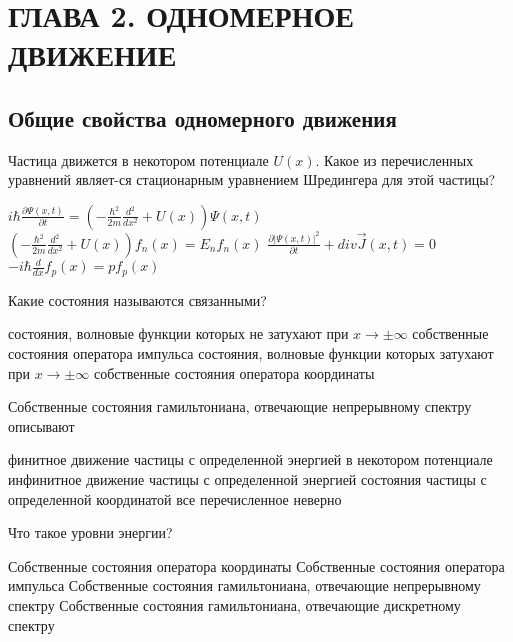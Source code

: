 \documentclass[11pt,a4paper]{exam}
\begin{document}
\section{ ГЛАВА 2. ОДНОМЕРНОЕ ДВИЖЕНИЕ }



\subsection{ Общие свойства одномерного движения }
\begin{questions}

\question Частица движется в некотором потенциале $U(x)$. Какое из перечисленных уравнений являет-ся стационарным уравнением Шредингера для этой частицы?
\begin{choices}
\choice $i\hbar \frac{{\partial \Psi (x,t)}}{{\partial t}} = \left( { - \frac{{{\hbar ^2}}}{{2m}}\frac{{{d^2}}}{{d{x^2}}} + U(x)} \right)\Psi (x,t)$       
\choice $\left( { - \frac{{{\hbar ^2}}}{{2m}}\frac{{{d^2}}}{{d{x^2}}} + U(x)} \right){f_n}(x) = {E_n}{f_n}(x)$
\choice $\frac{{\partial |\Psi (x,t){|^2}}}{{\partial t}} + div\vec J(x,t) = 0$          
\choice $ - i\hbar \frac{d}{{dx}}{f_p}(x) = p{f_p}(x)$
\end{choices}

\question Какие состояния называются связанными?
\begin{choices}
\choice состояния, волновые функции которых не затухают при $x \to  \pm \infty $ 
\choice  собственные состояния оператора импульса
\choice состояния, волновые функции которых затухают при $x \to  \pm \infty $
\choice собственные состояния оператора координаты
\end{choices}

\question Собственные состояния гамильтониана, отвечающие непрерывному спектру описывают
\begin{choices}
\choice финитное движение частицы с определенной энергией в некотором потенциале
\choice инфинитное движение частицы с определенной энергией
\choice состояния частицы с определенной координатой
\choice все перечисленное неверно 
\end{choices}

\question Что такое уровни энергии? 
\begin{choices}
\choice Собственные состояния оператора координаты
\choice Собственные состояния оператора импульса
\choice Собственные состояния гамильтониана, отвечающие непрерывному спектру
\choice Собственные состояния гамильтониана, отвечающие дискретному спектру
\end{choices}


\end{questions}
\end{document}
